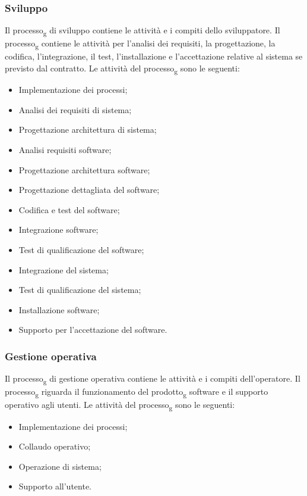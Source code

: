 \subsubsection{Sviluppo}
Il processo\textsubscript{g} di sviluppo contiene le attività e i compiti dello sviluppatore.
Il processo\textsubscript{g} contiene le attività per l'analisi dei requisiti, la progettazione, la codifica, l'integrazione, il test, l'installazione e l'accettazione relative al sistema se previsto dal contratto.
Le attività del processo\textsubscript{g} sono le seguenti:
\begin{itemize}
\item Implementazione dei processi;
\item Analisi dei requisiti di sistema;
\item Progettazione architettura di sistema;
\item Analisi requisiti software;
\item Progettazione architettura software;
\item Progettazione dettagliata del software;
\item Codifica e test del software;
\item Integrazione software;
\item Test di qualificazione del software;
\item Integrazione del sistema;
\item Test di qualificazione del sistema; 
\item Installazione software;
\item Supporto per l'accettazione del software.
\end{itemize}

\subsubsection{Gestione operativa}
Il processo\textsubscript{g} di gestione operativa contiene le attività e i compiti dell'operatore. Il processo\textsubscript{g} riguarda il funzionamento del prodotto\textsubscript{g} software e il supporto operativo agli utenti. 
Le attività del processo\textsubscript{g} sono le seguenti:
\begin{itemize}
\item Implementazione dei processi;
\item Collaudo operativo;
\item Operazione di sistema;
\item Supporto all'utente.
\end{itemize}


